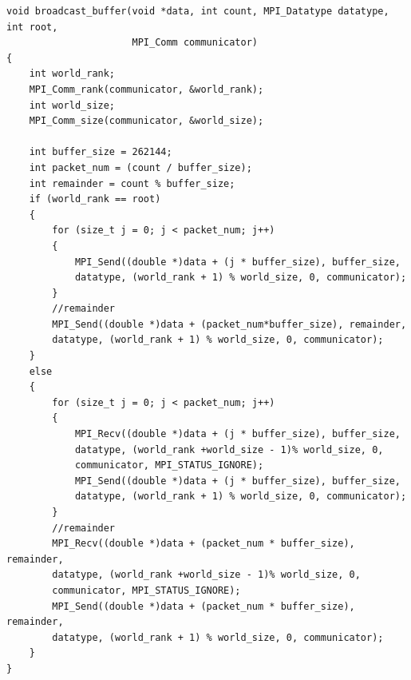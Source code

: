 \documentclass[article]{scrartcl}
\begin{document}
\begin{lstlisting}[frame=single]
void broadcast_buffer(void *data, int count, MPI_Datatype datatype, int root,
                      MPI_Comm communicator)
{
    int world_rank;
    MPI_Comm_rank(communicator, &world_rank);
    int world_size;
    MPI_Comm_size(communicator, &world_size);

    int buffer_size = 262144;
    int packet_num = (count / buffer_size); 
    int remainder = count % buffer_size;
    if (world_rank == root)
    {
        for (size_t j = 0; j < packet_num; j++)
        {
            MPI_Send((double *)data + (j * buffer_size), buffer_size, 
            datatype, (world_rank + 1) % world_size, 0, communicator);
        }
        //remainder
        MPI_Send((double *)data + (packet_num*buffer_size), remainder, 
        datatype, (world_rank + 1) % world_size, 0, communicator);
    }
    else
    {
        for (size_t j = 0; j < packet_num; j++)
        {
            MPI_Recv((double *)data + (j * buffer_size), buffer_size, 
            datatype, (world_rank +world_size - 1)% world_size, 0, 
            communicator, MPI_STATUS_IGNORE);
            MPI_Send((double *)data + (j * buffer_size), buffer_size, 
            datatype, (world_rank + 1) % world_size, 0, communicator);
        }
        //remainder
        MPI_Recv((double *)data + (packet_num * buffer_size), remainder, 
        datatype, (world_rank +world_size - 1)% world_size, 0, 
        communicator, MPI_STATUS_IGNORE);
        MPI_Send((double *)data + (packet_num * buffer_size), remainder, 
        datatype, (world_rank + 1) % world_size, 0, communicator);
    }
}
  \end{lstlisting}
\end{document}
